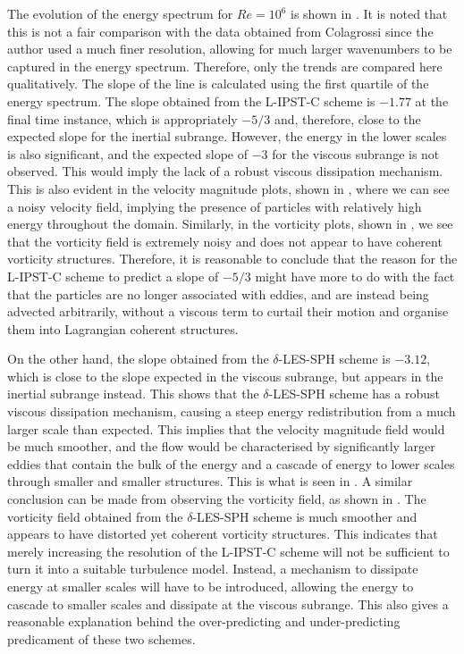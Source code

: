 The evolution of the energy spectrum for $Re=10^6$ is shown in .
It is noted that this is not a fair comparison with the data obtained from Colagrossi since the author used a much finer resolution, allowing for much larger wavenumbers to be captured in the energy spectrum.
Therefore, only the trends are compared here qualitatively. The slope of the line is calculated using the first quartile of the energy spectrum. The slope obtained from the L-IPST-C scheme is $-1.77$ at the final time instance, which is appropriately $-5/3$ and, therefore, close to the expected slope for the inertial subrange.
However, the energy in the lower scales is also significant, and the expected slope of $-3$ for the viscous subrange is not observed.
This would imply the lack of a robust viscous dissipation mechanism. This is also evident in the velocity magnitude plots, shown in , where we can see a noisy velocity field, implying the presence of particles with relatively high energy throughout the domain. Similarly, in the vorticity plots, shown in , we see that the vorticity field is extremely noisy and does not appear to have coherent vorticity structures.
Therefore, it is reasonable to conclude that the reason for the L-IPST-C scheme to predict a slope of $-5/3$ might have more to do with the fact that the particles are no longer associated with eddies, and are instead being advected arbitrarily, without a viscous term to curtail their motion and organise them into Lagrangian coherent structures.

On the other hand, the slope obtained from the $\delta$-LES-SPH scheme is $-3.12$, which is close to the slope expected in the viscous subrange, but appears in the inertial subrange instead. This shows that the $\delta$-LES-SPH scheme has a robust viscous dissipation mechanism, causing a steep energy redistribution from a much larger scale than expected. This implies that the velocity magnitude field would be much smoother, and the flow would be characterised by significantly larger eddies that contain the bulk of the energy and a cascade of energy to lower scales through smaller and smaller structures. This is what is seen in .
A similar conclusion can be made from observing the vorticity field, as shown in . The vorticity field obtained from the $\delta$-LES-SPH scheme is much smoother and appears to have distorted yet coherent vorticity structures.
This indicates that merely increasing the resolution of the L-IPST-C scheme will not be sufficient to turn it into a suitable turbulence model. Instead, a mechanism to dissipate energy at smaller scales will have to be introduced, allowing the energy to cascade to smaller scales and dissipate at the viscous subrange.
This also gives a reasonable explanation behind the over-predicting and under-predicting predicament of these two schemes.



